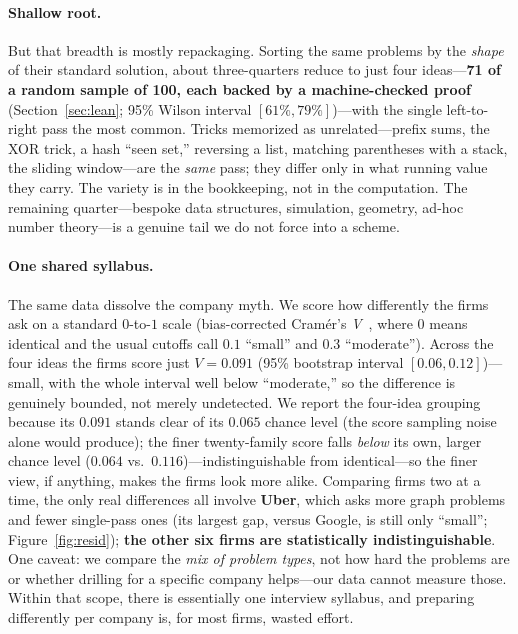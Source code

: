 \documentclass[11pt]{article}
\newcommand{\V}{\textit{V}}
\begin{document}
\paragraph{Shallow root.} But that breadth is mostly repackaging. Sorting the same problems by the
\emph{shape} of their standard solution, about three-quarters reduce to just four ideas---\textbf{71 of a
random sample of 100, each backed by a machine-checked proof} (Section~\ref{sec:lean}; 95\%
Wilson interval $[61\%,79\%]$)---with the single left-to-right pass the most common. Tricks
memorized as unrelated---prefix
sums, the XOR trick, a hash ``seen set,'' reversing a list, matching parentheses with a stack, the sliding
window---are the \emph{same} pass; they differ only in what running value they carry. The variety is in the
bookkeeping, not in the computation. The remaining quarter---bespoke data structures, simulation, geometry,
ad-hoc number theory---is a genuine tail we do not force into a scheme.

\paragraph{One shared syllabus.} The same data dissolve the company myth. We score how differently the firms
ask on a standard $0$-to-$1$ scale (bias-corrected Cram\'er's \V~\cite{cramer46,bergsma13}, where $0$ means
identical and the usual cutoffs call $0.1$ ``small'' and $0.3$ ``moderate''). Across the four ideas the firms
score just $\V = 0.091$ (95\% bootstrap interval $[0.06,0.12]$)---small, with the whole interval well below
``moderate,'' so the difference is genuinely bounded, not merely undetected. We report the four-idea grouping because its $0.091$ stands clear of its $0.065$ chance level
(the score sampling noise alone would produce); the finer twenty-family score falls
\emph{below} its own, larger chance level ($0.064$ vs.\ $0.116$)---indistinguishable from
identical---so the finer view, if anything, makes the firms look more alike. Comparing firms two at a time, the only real differences all involve
\textbf{Uber}, which asks more graph problems and fewer single-pass ones (its largest
gap, versus Google, is still only ``small''; Figure~\ref{fig:resid}); \textbf{the other six firms are
statistically indistinguishable}. One caveat: we compare the \emph{mix of problem types}, not how hard the
problems are or whether drilling for a specific company helps---our data cannot measure those. Within that
scope, there is essentially one interview syllabus, and preparing differently per company is, for most firms,
wasted effort.
\end{document}
